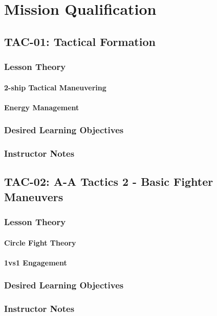 \part{Mission Qualification}
  \chapter{TAC-01: Tactical Formation}
    \section{Lesson Theory}
      \subsection{2-ship Tactical Maneuvering}
      \subsection{Energy Management}
    \section{Desired Learning Objectives}
    \section{Instructor Notes}

  \chapter{TAC-02: A-A Tactics 2 - Basic Fighter Maneuvers}
    \section{Lesson Theory}
      \subsection{Circle Fight Theory}
      \subsection{1vs1 Engagement}
    \section{Desired Learning Objectives}
    \section{Instructor Notes}

